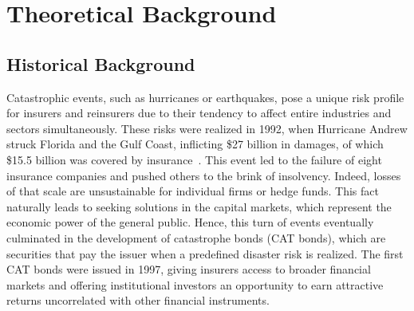 \documentclass{amsart}
\title{}
\author{}
\date{}
\theoremstyle{plain}
\theoremstyle{definition}
\theoremstyle{definition}
\theoremstyle{remark}
\begin{document}


\begin{abstract}
    Insurance Linked Securities are financial instruments whose purpose is to insure issuers against catastrophic natural events such as earthquakes, hurricanes, and similar calamities. In contrast to classical insurance, rather than utilizing a single insurer, risk is diversified among investors in the financial market, allowing coverage of much larger sums than classical insurance, while offering investors an attractive premium over risk-free yields. As a result,
    issuers and investors alike are interested in a thorough analysis of the probability of the insured calamity. However, probabilistic information about such events is scarce, and usually only the attachment probability, exhaustion probability, and expected loss are known. Our research analyzes the leeway of a distribution when these values are fixed.
\end{abstract}
\maketitle

\section{Theoretical Background}
\subsection{Historical Background}
Catastrophic events, such as hurricanes or earthquakes, pose a unique risk profile for insurers and reinsurers due to their tendency to affect entire industries and sectors simultaneously. These risks were realized in 1992, when Hurricane Andrew struck Florida and the Gulf Coast, inflicting \$27 billion in damages, of which \$15.5 billion was covered by insurance~\cite{TR:polacek-2018}. This event led to the failure of eight insurance companies and pushed others to the brink of insolvency.
Indeed, losses of that scale are unsustainable for individual firms or hedge funds. This fact naturally leads to seeking solutions in the capital markets, which represent the economic power of the general public. 
Hence, this turn of events eventually culminated in the development of catastrophe bonds (CAT bonds), which are securities that pay the issuer when a predefined disaster risk is realized. The first CAT bonds were issued in 1997, giving insurers access to broader financial markets and offering institutional investors an opportunity to earn attractive returns uncorrelated with other financial instruments.
\end{document}
